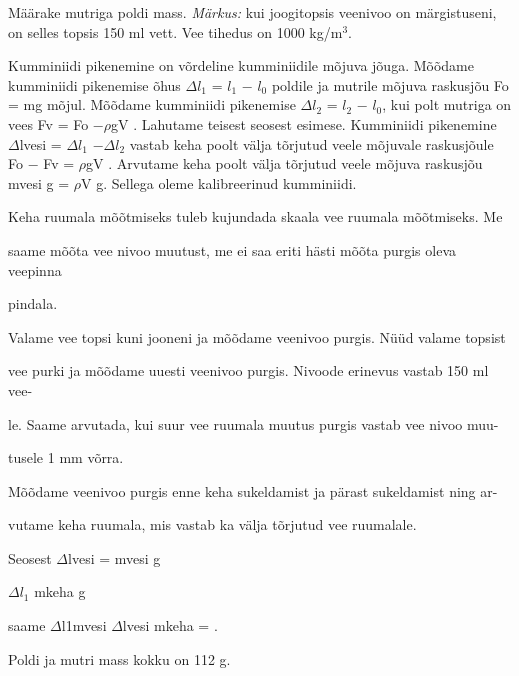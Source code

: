 
Määrake mutriga poldi mass.
\textit{Märkus:} kui joogitopsis veenivoo on märgistuseni, on selles topsis 150 ml vett. Vee tihedus on 1000 kg/m$^3$.

\hint

\solu
Kumminiidi pikenemine on võrdeline kumminiidile mõjuva jõuga. Mõõdame kumminiidi pikenemise õhus $\Delta$$l_1$ = $l_1$ $-$ $l_0$ poldile ja mutrile mõjuva raskusjõu Fo = mg mõjul. Mõõdame kumminiidi pikenemise $\Delta$$l_2$ = $l_2$ $-$ $l_0$, kui polt mutriga on vees Fv = Fo $- \rho$gV . Lahutame teisest seosest esimese. Kumminiidi pikenemine $\Delta$lvesi = $\Delta$$l_1$ $- \Delta$$l_2$ vastab keha poolt välja tõrjutud veele mõjuvale raskusjõule Fo $-$ Fv = $\rho$gV . Arvutame keha poolt välja tõrjutud veele mõjuva raskusjõu mvesi g = $\rho$V g. Sellega oleme kalibreerinud kumminiidi.

Keha ruumala mõõtmiseks tuleb kujundada skaala vee ruumala mõõtmiseks. Me

saame mõõta vee nivoo muutust, me ei saa eriti hästi mõõta purgis oleva veepinna

pindala.

Valame vee topsi kuni jooneni ja mõõdame veenivoo purgis. Nüüd valame topsist

vee purki ja mõõdame uuesti veenivoo purgis. Nivoode erinevus vastab 150 ml vee-

le. Saame arvutada, kui suur vee ruumala muutus purgis vastab vee nivoo muu-

tusele 1 mm võrra.

Mõõdame veenivoo purgis enne keha sukeldamist ja pärast sukeldamist ning ar-

vutame keha ruumala, mis vastab ka välja tõrjutud vee ruumalale.

Seosest $\Delta$lvesi = mvesi g

$\Delta$$l_1$ mkeha g

saame $\Delta$l1mvesi $\Delta$lvesi mkeha = .

Poldi ja mutri mass kokku on 112 g.
\probend
